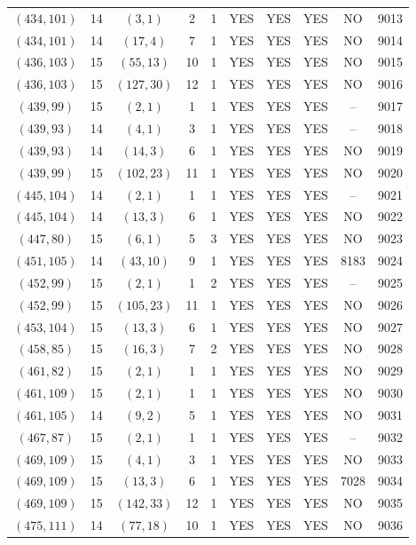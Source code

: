 \begin{longtable}{|c|c|c|c|c|c|c|c|c|c|}
$(434, 101)$ & 14 & $(3, 1)$ & 2 & 1 & YES & YES & YES & NO & 9013\\
$(434, 101)$ & 14 & $(17, 4)$ & 7 & 1 & YES & YES & YES & NO & 9014\\
$(436, 103)$ & 15 & $(55, 13)$ & 10 & 1 & YES & YES & YES & NO & 9015\\
$(436, 103)$ & 15 & $(127, 30)$ & 12 & 1 & YES & YES & YES & NO & 9016\\
$(439, 99)$ & 15 & $(2, 1)$ & 1 & 1 & YES & YES & YES & -- & 9017\\
$(439, 93)$ & 14 & $(4, 1)$ & 3 & 1 & YES & YES & YES & -- & 9018\\
$(439, 93)$ & 14 & $(14, 3)$ & 6 & 1 & YES & YES & YES & NO & 9019\\
$(439, 99)$ & 15 & $(102, 23)$ & 11 & 1 & YES & YES & YES & NO & 9020\\
$(445, 104)$ & 14 & $(2, 1)$ & 1 & 1 & YES & YES & YES & -- & 9021\\
$(445, 104)$ & 14 & $(13, 3)$ & 6 & 1 & YES & YES & YES & NO & 9022\\
$(447, 80)$ & 15 & $(6, 1)$ & 5 & 3 & YES & YES & YES & NO & 9023\\
$(451, 105)$ & 14 & $(43, 10)$ & 9 & 1 & YES & YES & YES & 8183 & 9024\\
$(452, 99)$ & 15 & $(2, 1)$ & 1 & 2 & YES & YES & YES & -- & 9025\\
$(452, 99)$ & 15 & $(105, 23)$ & 11 & 1 & YES & YES & YES & NO & 9026\\
$(453, 104)$ & 15 & $(13, 3)$ & 6 & 1 & YES & YES & YES & NO & 9027\\
$(458, 85)$ & 15 & $(16, 3)$ & 7 & 2 & YES & YES & YES & NO & 9028\\
$(461, 82)$ & 15 & $(2, 1)$ & 1 & 1 & YES & YES & YES & NO & 9029\\
$(461, 109)$ & 15 & $(2, 1)$ & 1 & 1 & YES & YES & YES & NO & 9030\\
$(461, 105)$ & 14 & $(9, 2)$ & 5 & 1 & YES & YES & YES & NO & 9031\\
$(467, 87)$ & 15 & $(2, 1)$ & 1 & 1 & YES & YES & YES & -- & 9032\\
$(469, 109)$ & 15 & $(4, 1)$ & 3 & 1 & YES & YES & YES & NO & 9033\\
$(469, 109)$ & 15 & $(13, 3)$ & 6 & 1 & YES & YES & YES & 7028 & 9034\\
$(469, 109)$ & 15 & $(142, 33)$ & 12 & 1 & YES & YES & YES & NO & 9035\\
$(475, 111)$ & 14 & $(77, 18)$ & 10 & 1 & YES & YES & YES & NO & 9036\\

\end{longtable}
